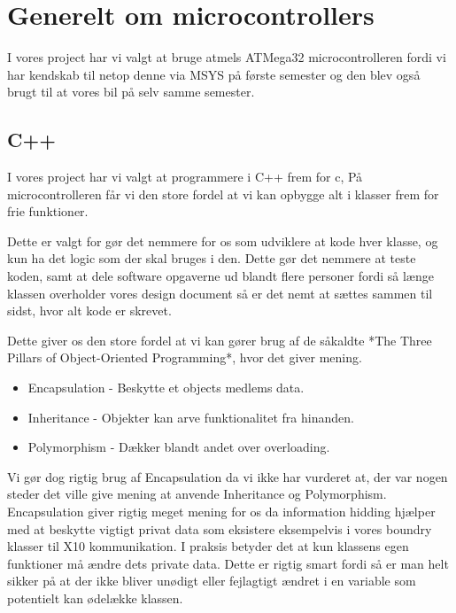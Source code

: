 \section{Generelt om microcontrollers}
I vores project har vi valgt at bruge atmels ATMega32 microcontrolleren fordi vi har kendskab til netop denne via MSYS på første semester og den blev også brugt til at vores bil på selv samme semester.

\subsection{C++}
I vores project har vi valgt at programmere i C++ frem for c, På microcontrolleren får vi den store fordel at vi kan opbygge alt i klasser frem for frie funktioner.

Dette er valgt for gør det nemmere for os som udviklere at kode hver klasse, og kun ha det logic som der skal bruges i den. Dette gør det nemmere at teste koden, samt at dele software opgaverne ud blandt flere personer fordi så længe klassen overholder vores design document så er det nemt at sættes sammen til sidst, hvor alt kode er skrevet.

Dette giver os den store fordel at vi kan gører brug af de såkaldte *The Three Pillars of Object-Oriented Programming*, hvor det giver mening.

\begin{itemize}
  \item Encapsulation - Beskytte et objects medlems data.
  \item Inheritance   - Objekter kan arve funktionalitet fra hinanden.
  \item Polymorphism  - Dækker blandt andet over overloading.
\end{itemize}

Vi gør dog rigtig brug af Encapsulation da vi ikke har vurderet at, der var nogen steder det ville give mening at anvende Inheritance og Polymorphism. Encapsulation giver rigtig meget mening for os da information hidding hjælper med at beskytte vigtigt privat data som eksistere eksempelvis i vores boundry klasser til X10 kommunikation. I praksis betyder det at kun klassens egen funktioner må ændre dets private data. Dette er rigtig smart fordi så er man helt sikker på at der ikke bliver unødigt eller fejlagtigt ændret i en variable som potentielt kan ødelække klassen.

